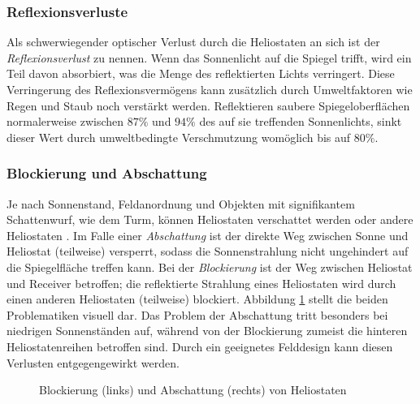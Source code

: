 \subsubsection*{Reflexionsverluste} \label{subsubsec_Reflexionsverluste}
Als schwerwiegender optischer Verlust durch die Heliostaten an sich ist der \textit{Reflexionsverlust} zu nennen.
Wenn das Sonnenlicht auf die Spiegel trifft, wird ein Teil davon absorbiert, was die Menge des reflektierten Lichts verringert.
Diese Verringerung des Reflexionsvermögens kann zusätzlich durch Umweltfaktoren wie Regen und Staub noch verstärkt werden.
Reflektieren saubere Spiegeloberflächen normalerweise zwischen $87 \%$ und $94 \%$ des auf sie treffenden Sonnenlichts, sinkt dieser Wert durch umweltbedingte Verschmutzung womöglich bis auf $80 \%$. \cite[S.14]{DissBelhomme}

\subsubsection*{Blockierung und Abschattung} \label{subsubsec_blockingshading}
Je nach Sonnenstand, Feldanordnung und Objekten mit signifikantem Schattenwurf, wie dem Turm, können Heliostaten verschattet werden oder andere Heliostaten .
Im Falle einer \textit{Abschattung} ist der direkte Weg zwischen Sonne und Heliostat (teilweise) versperrt, sodass die Sonnenstrahlung nicht ungehindert auf die Spiegelfläche treffen kann.
Bei der \textit{Blockierung} ist der Weg zwischen Heliostat und Receiver betroffen; die reflektierte Strahlung eines Heliostaten wird durch einen anderen Heliostaten (teilweise) blockiert.
Abbildung \ref{fig_AbschattungBlockieren} stellt die beiden Problematiken visuell dar.
Das Problem der Abschattung tritt besonders bei niedrigen Sonnenständen auf, während von der Blockierung zumeist die hinteren Heliostatenreihen betroffen sind.
Durch ein geeignetes Felddesign kann diesen Verlusten entgegengewirkt werden. \cite[S.686]{Wei2010}

\begin{figure}[h!]
    \centering
    \setlength{\fboxsep}{1pt}
    \setlength{\fboxrule}{1pt}
\caption[Blockierung und Abschattung von Heliostaten]{Blockierung (links) und Abschattung (rechts) von Heliostaten \cite[S.15]{DissBelhomme}}
    \label{fig_AbschattungBlockieren}
\end{figure}

